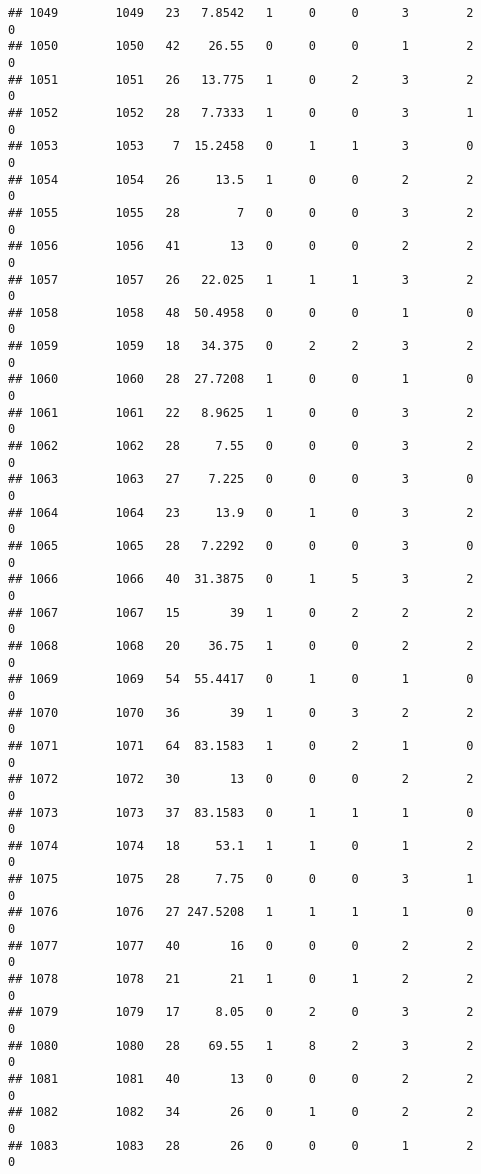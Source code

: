 \documentclass[
]{article}
\begin{document}
\begin{verbatim}
## 1049        1049   23   7.8542   1     0     0      3        2         0
## 1050        1050   42    26.55   0     0     0      1        2         0
## 1051        1051   26   13.775   1     0     2      3        2         0
## 1052        1052   28   7.7333   1     0     0      3        1         0
## 1053        1053    7  15.2458   0     1     1      3        0         0
## 1054        1054   26     13.5   1     0     0      2        2         0
## 1055        1055   28        7   0     0     0      3        2         0
## 1056        1056   41       13   0     0     0      2        2         0
## 1057        1057   26   22.025   1     1     1      3        2         0
## 1058        1058   48  50.4958   0     0     0      1        0         0
## 1059        1059   18   34.375   0     2     2      3        2         0
## 1060        1060   28  27.7208   1     0     0      1        0         0
## 1061        1061   22   8.9625   1     0     0      3        2         0
## 1062        1062   28     7.55   0     0     0      3        2         0
## 1063        1063   27    7.225   0     0     0      3        0         0
## 1064        1064   23     13.9   0     1     0      3        2         0
## 1065        1065   28   7.2292   0     0     0      3        0         0
## 1066        1066   40  31.3875   0     1     5      3        2         0
## 1067        1067   15       39   1     0     2      2        2         0
## 1068        1068   20    36.75   1     0     0      2        2         0
## 1069        1069   54  55.4417   0     1     0      1        0         0
## 1070        1070   36       39   1     0     3      2        2         0
## 1071        1071   64  83.1583   1     0     2      1        0         0
## 1072        1072   30       13   0     0     0      2        2         0
## 1073        1073   37  83.1583   0     1     1      1        0         0
## 1074        1074   18     53.1   1     1     0      1        2         0
## 1075        1075   28     7.75   0     0     0      3        1         0
## 1076        1076   27 247.5208   1     1     1      1        0         0
## 1077        1077   40       16   0     0     0      2        2         0
## 1078        1078   21       21   1     0     1      2        2         0
## 1079        1079   17     8.05   0     2     0      3        2         0
## 1080        1080   28    69.55   1     8     2      3        2         0
## 1081        1081   40       13   0     0     0      2        2         0
## 1082        1082   34       26   0     1     0      2        2         0
## 1083        1083   28       26   0     0     0      1        2         0

\end{verbatim}
\end{document}
